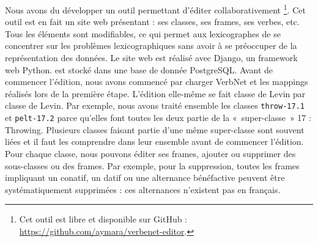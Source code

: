 Nous avons du développer un outil permettant d'éditer collaborativement
\verbenet{}\footnote{Cet outil est libre et disponible sur GitHub :
\url{https://github.com/aymara/verbenet-editor}.}. Cet outil est en fait un
site web présentant \verbenet{}: ses classes, ses frames, ses verbes, etc.
Tous les éléments sont modifiables, ce qui permet aux lexicographes de se
concentrer sur les problèmes lexicographiques sans avoir à se préoccuper de la
représentation des données. Le site web est réalisé avec Django, un framework
web Python. \verbenet{} est stocké dans une base de donnée PostgreSQL. Avant de
commencer l'édition, nous avons commencé par charger VerbNet et les mappings
réalisés lors de la première étape. L'édition elle-même se fait classe de Levin
par classe de Levin. Par exemple, nous avons traité ensemble les classes
{\color{blue}\texttt{throw-17.1}} et {\color{blue}\texttt{pelt-17.2}} parce
qu'elles font toutes les deux partie de la «~super-classe~» 17 : Throwing.
Plusieurs classes faisant partie d'une même super-classe sont souvent liées et
il faut les comprendre dans leur ensemble avant de commencer l'édition. Pour
chaque classe, nous pouvons éditer ses frames, ajouter ou supprimer des
sous-classes ou des frames.  Par exemple, pour la suppression, toutes les
frames impliquant un conatif, un datif ou une alternance bénéfactive peuvent
être systématiquement supprimées : ces alternances n'existent pas en français.

